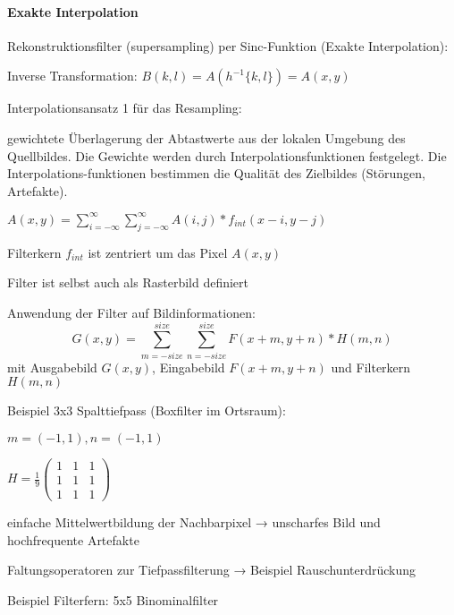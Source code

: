 \documentclass[landscape]{article}
\begin{document}
\begin{multicols}{3}
  \paragraph{Exakte Interpolation}
  Rekonstruktionsfilter (supersampling) per Sinc-Funktion (Exakte Interpolation):
  \begin{itemize*}
    \item Inverse Transformation: $B(k, l) = A(h^{-1} \{k, l\}) = A(x, y )$
    \item Interpolationsansatz 1 für das Resampling:
          \begin{itemize*}
            \item gewichtete Überlagerung der Abtastwerte aus der lokalen Umgebung des Quellbildes. Die Gewichte werden durch Interpolationsfunktionen festgelegt. Die Interpolations-funktionen bestimmen die Qualität des Zielbildes (Störungen, Artefakte).
            \item $A(x,y)=\sum_{i=-\infty}^{\infty}\sum_{j=-\infty}^{\infty}A(i,j) * f_{int}(x-i, y-j)$
            \item Filterkern $f_{int}$ ist zentriert um das Pixel $A(x, y)$
            \item Filter ist selbst auch als Rasterbild definiert
          \end{itemize*}
  \end{itemize*}
  
  Anwendung der Filter auf Bildinformationen: 
  $$G(x,y)=\sum_{m=-size}^{size} \sum_{n=-size}^{size} F(x+m, y+n) * H(m,n)$$
  mit Ausgabebild $G(x,y)$, Eingabebild $F(x+m,y+n)$ und Filterkern $H(m,n)$
  
  Beispiel 3x3 Spalttiefpass (Boxfilter im Ortsraum):
  \begin{itemize*}
    \item $m=(-1,1), n=(-1,1)$
    \item $H=\frac{1}{9} \begin{pmatrix} 1&1&1\\ 1&1&1 \\ 1&1&1 \end{pmatrix}$
    \item einfache Mittelwertbildung der Nachbarpixel → unscharfes Bild und hochfrequente Artefakte
    \item Faltungsoperatoren zur Tiefpassfilterung → Beispiel Rauschunterdrückung
  \end{itemize*}
  
  Beispiel Filterfern: 5x5 Binominalfilter
  

\end{multicols}
\end{document}
